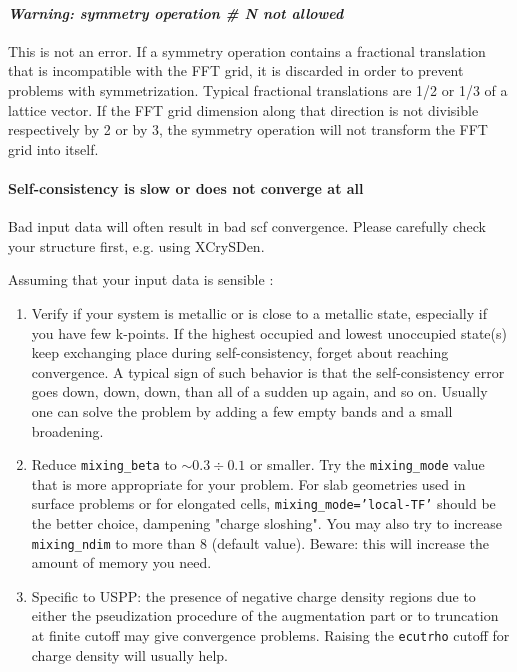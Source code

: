 \documentclass[12pt,a4paper]{article}
\begin{document}
\paragraph{{\em Warning: symmetry operation \# N not allowed}}
This is not an error.  If a symmetry operation contains a fractional
translation that is incompatible with the FFT grid, it is discarded in
order to prevent problems with symmetrization. Typical fractional 
translations are 1/2 or 1/3 of a lattice vector. If the FFT grid
dimension along that direction is not divisible respectively by 2 or
by 3, the symmetry operation will not transform the FFT grid into
itself. 

\paragraph{Self-consistency is slow or does not converge at all}

Bad input data will often result in bad scf convergence. Please 
carefully check your structure first, e.g. using XCrySDen.
 
Assuming that your input data is sensible :
\begin{enumerate}
\item Verify if your system is metallic or is close to a metallic
  state, especially if you have few k-points. If the highest occupied
  and lowest unoccupied state(s) keep exchanging place during
  self-consistency, forget about reaching convergence. A typical sign
  of such behavior is that the self-consistency error goes down, down,
  down, than all of a sudden up again, and so on. Usually one can
  solve the problem by adding a few empty bands and a small
  broadening. 
\item Reduce \texttt{mixing\_beta} to $\sim 0.3\div
  0.1$ or smaller. Try the \texttt{mixing\_mode} value that is more
  appropriate for your problem. For slab geometries used in surface
  problems or for elongated cells,  \texttt{mixing\_mode='local-TF'}
  should be the better choice, dampening "charge sloshing". You may
  also try to increase \texttt{mixing\_ndim} to more than 8 (default
  value). Beware: this will increase the amount of memory you need. 
\item Specific to USPP: the presence of negative charge density
  regions due to either the pseudization procedure of the augmentation
  part or to truncation at finite cutoff may give convergence
  problems. Raising the \texttt{ecutrho} cutoff for charge density will
  usually help.
\end{enumerate}
\end{document}
